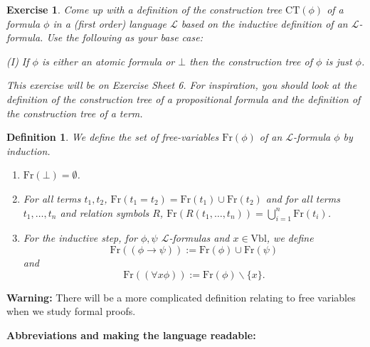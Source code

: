 \documentclass[11pt]{article}
\newcommand{\Fr}{\textrm{Fr}}
\newcommand{\Vbl}{\textrm{Vbl}}
\newtheorem*{exercise*}{Exercise}
\newtheorem{definition}[theorem]{Definition}
\newcommand{\mcal}[1]{\mathcal{#1}}
\begin{document}
\bigskip

\begin{exercise*}
Come up with a definition of the construction tree $\textrm{CT}(\phi)$ of a formula $\phi$ in a (first order) language $\mcal{L}$ based on the inductive definition of an $\mcal{L}$-formula. Use the following as your base case:

\bigskip

\noindent
(I) If $\phi$ is either an atomic formula or $\bot$ then the construction tree of $\phi$ is just $\phi$.

\bigskip

\noindent
This exercise will be on Exercise Sheet 6. For inspiration, you should look at the definition of the construction tree of a propositional formula and the definition of the construction tree of a term.
\end{exercise*}

\begin{definition}\label{freevar}
We define the set of free-variables $\Fr(\phi)$ of an $\mcal{L}$-formula $\phi$ by induction.
\begin{enumerate}
\item[(0)] $\Fr(\bot)=\emptyset$.
\item[(1)] For all terms $t_1,t_2$, $\Fr(t_1=t_2)=\Fr(t_1)\cup\Fr(t_2)$ and for all terms $t_1,\ldots,t_n$ and relation symbols $R$, $\Fr(R(t_1,\ldots,t_n))=\bigcup_{i=1}^n\Fr(t_i)$.
\item[(2)] For the inductive step, for $\phi,\psi$ $\mcal{L}$-formulas and $x\in \Vbl$, we define
\[\Fr((\phi\rightarrow \psi)):=\Fr(\phi)\cup\Fr(\psi)\] and
\[\Fr((\forall x\phi)):=\Fr(\phi)\backslash\{x\}.\]
\end{enumerate}
\end{definition}

\bigskip

\noindent
\textbf{Warning:} There will be a more complicated definition relating to free variables when we study formal proofs.

\bigskip

\noindent
\textbf{Abbreviations and making the language readable:}
\end{document}
